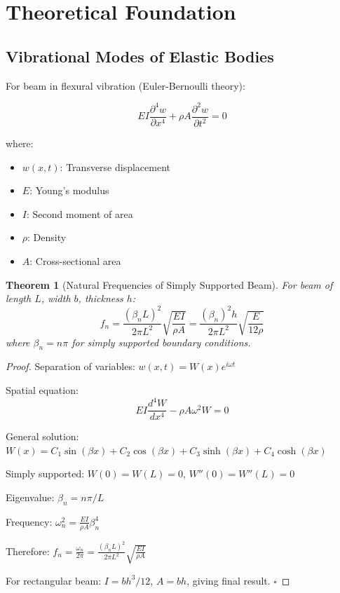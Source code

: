 \documentclass[12pt,a4paper]{article}
\newtheorem{theorem}{Theorem}
\begin{document}
\section{Theoretical Foundation}

\subsection{Vibrational Modes of Elastic Bodies}

For beam in flexural vibration (Euler-Bernoulli theory):

\begin{equation}
EI\frac{\partial^4 w}{\partial x^4} + \rho A \frac{\partial^2 w}{\partial t^2} = 0
\end{equation}

where:
\begin{itemize}
\item $w(x,t)$: Transverse displacement
\item $E$: Young's modulus
\item $I$: Second moment of area
\item $\rho$: Density
\item $A$: Cross-sectional area
\end{itemize}

\begin{theorem}[Natural Frequencies of Simply Supported Beam]
For beam of length $L$, width $b$, thickness $h$:
\begin{equation}
f_n = \frac{(\beta_n L)^2}{2\pi L^2}\sqrt{\frac{EI}{\rho A}} = \frac{(\beta_n)^2 h}{2\pi L^2}\sqrt{\frac{E}{12\rho}}
\end{equation}
where $\beta_n = n\pi$ for simply supported boundary conditions.
\end{theorem}

\begin{proof}
Separation of variables: $w(x,t) = W(x)e^{i\omega t}$

Spatial equation:
\begin{equation}
EI\frac{d^4 W}{dx^4} - \rho A \omega^2 W = 0
\end{equation}

General solution: $W(x) = C_1 \sin(\beta x) + C_2 \cos(\beta x) + C_3 \sinh(\beta x) + C_4 \cosh(\beta x)$

Simply supported: $W(0) = W(L) = 0$, $W''(0) = W''(L) = 0$

Eigenvalue: $\beta_n = n\pi/L$

Frequency: $\omega_n^2 = \frac{EI}{\rho A}\beta_n^4$

Therefore: $f_n = \frac{\omega_n}{2\pi} = \frac{(\beta_n L)^2}{2\pi L^2}\sqrt{\frac{EI}{\rho A}}$

For rectangular beam: $I = bh^3/12$, $A = bh$, giving final result. $\square$
\end{proof}
\end{document}
